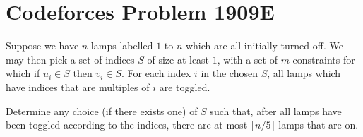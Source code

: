 \documentclass[a4paper, 12pt]{article}
\begin{document}
\section*{Codeforces Problem 1909E}

\begin{chirpbox}
    \begin{problem}
        Suppose we have \( n \) lamps labelled \( 1 \) to \( n \) which are all initially turned off. We may then pick a set of indices \( S \) of size at least \( 1 \), with a set of \( m \) constraints for which if \( u_i \in S \) then \( v_i \in S \). For each index \( i \) in the chosen \( S \), all lamps which have indices that are multiples of \( i \) are toggled.

        \vspace{0.2cm}

        Determine any choice (if there exists one) of \( S \) such that, after all lamps have been toggled according to the indices, there are at most \( \lfloor n / 5 \rfloor \) lamps that are on.
    \end{problem}
\end{chirpbox}
\end{document}
